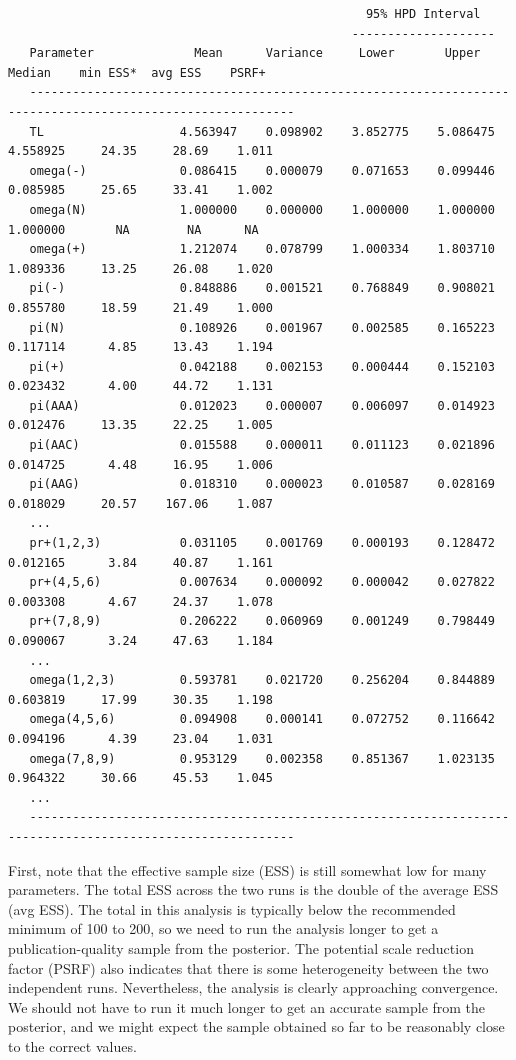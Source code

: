 \documentclass[12pt]{book}
\begin{document}
\begin{singlespacing}
\tiny
\begin{verbatim}
                                                  95% HPD Interval
                                                --------------------
   Parameter              Mean      Variance     Lower       Upper       Median    min ESS*  avg ESS    PSRF+ 
   -----------------------------------------------------------------------------------------------------------
   TL                   4.563947    0.098902    3.852775    5.086475    4.558925     24.35     28.69    1.011
   omega(-)             0.086415    0.000079    0.071653    0.099446    0.085985     25.65     33.41    1.002
   omega(N)             1.000000    0.000000    1.000000    1.000000    1.000000       NA        NA      NA   
   omega(+)             1.212074    0.078799    1.000334    1.803710    1.089336     13.25     26.08    1.020
   pi(-)                0.848886    0.001521    0.768849    0.908021    0.855780     18.59     21.49    1.000
   pi(N)                0.108926    0.001967    0.002585    0.165223    0.117114      4.85     13.43    1.194
   pi(+)                0.042188    0.002153    0.000444    0.152103    0.023432      4.00     44.72    1.131
   pi(AAA)              0.012023    0.000007    0.006097    0.014923    0.012476     13.35     22.25    1.005
   pi(AAC)              0.015588    0.000011    0.011123    0.021896    0.014725      4.48     16.95    1.006
   pi(AAG)              0.018310    0.000023    0.010587    0.028169    0.018029     20.57    167.06    1.087
   ...
   pr+(1,2,3)           0.031105    0.001769    0.000193    0.128472    0.012165      3.84     40.87    1.161
   pr+(4,5,6)           0.007634    0.000092    0.000042    0.027822    0.003308      4.67     24.37    1.078
   pr+(7,8,9)           0.206222    0.060969    0.001249    0.798449    0.090067      3.24     47.63    1.184
   ...
   omega(1,2,3)         0.593781    0.021720    0.256204    0.844889    0.603819     17.99     30.35    1.198
   omega(4,5,6)         0.094908    0.000141    0.072752    0.116642    0.094196      4.39     23.04    1.031
   omega(7,8,9)         0.953129    0.002358    0.851367    1.023135    0.964322     30.66     45.53    1.045
   ...
   -----------------------------------------------------------------------------------------------------------
\end{verbatim}
\normalsize
\end{singlespacing}

First, note that the effective sample size (ESS) is still somewhat low for many parameters. The total ESS
across the two runs is the double of the average ESS (avg ESS). The total in this analysis is typically below
the recommended minimum of 100 to 200, so we need to run the analysis longer to get a publication-quality
sample from the posterior. The potential scale reduction factor (PSRF) also indicates that there is some
heterogeneity between the two independent runs. Nevertheless, the analysis is clearly approaching
convergence. We should not have to run it much longer to get an accurate sample from the
posterior, and we might expect the sample obtained so far to be reasonably close to the correct values.
\end{document}
